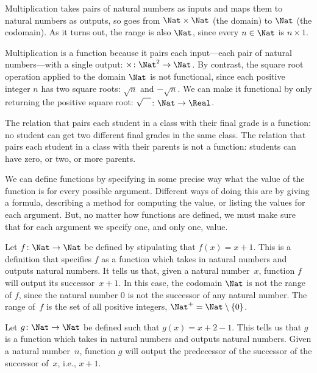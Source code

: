 \documentclass[../../../include/open-logic-section]{subfiles}
\begin{document}
\begin{ex}
Multiplication takes pairs of natural numbers as inputs and maps them
to natural numbers as outputs, so goes from $\Nat \times \Nat$ (the
domain) to $\Nat$ (the codomain). As it turns out, the range is also
$\Nat$, since every $n \in \Nat$ is $n \times 1$.
\end{ex}
\begin{ex}
Multiplication is a function because it pairs each input---each pair
of natural numbers---with a single output: $\times \colon \Nat^2 \to
\Nat$. By contrast, the square root operation applied to the domain
$\Nat$ is not functional, since each positive integer $n$ has two
square roots: $\sqrt{n}$ and $-\sqrt{n}$. We can make it functional by
only returning the positive square root: $\sqrt{\phantom{X}} \colon
\Nat \to \Real$. 
\end{ex}
\begin{ex}
	The relation that pairs each student in a class with
their final grade is a function: no student can get two different
final grades in the same class. The relation that pairs each student
in a class with their parents is not a function: students can have zero, or two, or more parents.
\end{ex}
\begin{explain}
We can define functions by specifying in some precise way what the
value of the function is for every possible argument. Different ways of
doing this are by giving a formula, describing a method for computing
the value, or listing the values for each argument. But, no matter how functions
are defined, we must make sure that for each argument we specify one,
and only one, value.
\end{explain}
\begin{ex}
Let $f \colon \Nat \to \Nat$ be defined by stipulating that $f(x) = x+1$. This
is a definition that specifies $f$ as a function which takes in
natural numbers and outputs natural numbers. It tells us that, given a
natural number~$x$, function $f$ will output its successor~$x+1$.
In this case, the codomain $\Nat$ is not the range of $f$, since the
natural number $0$ is not the successor of any natural number. The
range of~$f$ is the set of all positive integers, $\Nat^{+} = \Nat \setminus \{0\}$.
\end{ex}
\begin{ex}
Let $g \colon \Nat \to \Nat$ be defined such that $g(x) = x+2-1$. This
tells us that $g$ is a function which takes in natural numbers and
outputs natural numbers. Given a natural number~$n$, function $g$ will output
the predecessor of the successor of the successor of~$x$, i.e.,
$x+1$.
\end{ex}
\end{document}

